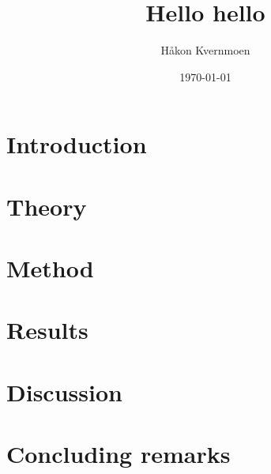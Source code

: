 \documentclass[twocolumn,english,notitlepage]{article}
\title{Hello hello}
\author{Håkon Kvernmoen}
\date{\today}
\begin{document}



\section{Introduction}


\section{Theory}


\section{Method}


\section{Results}


\section{Discussion}


\section{Concluding remarks} 



\newpage

\renewcommand{\theequation}{\thesection.\arabic{equation}}
\newpage
\begin{appendices}
     
\end{appendices}
\end{document}
